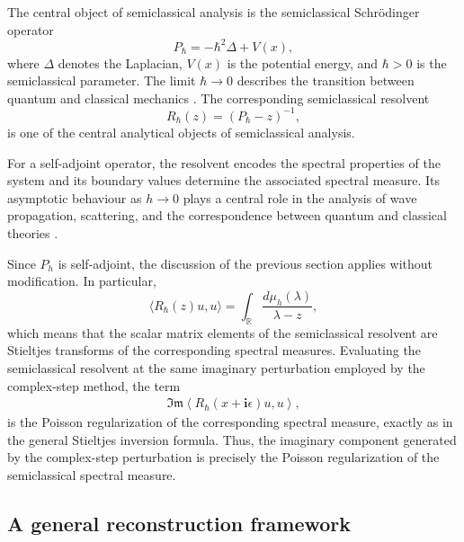 \documentclass[11pt]{article}
\newcommand{\imag}{\textbf{i}}
\newcommand{\ImagPart}{\mathfrak{Im}}
\begin{document}
    The central object of semiclassical analysis is the semiclassical Schr\"odinger operator
    \begin{equation}
    	P_{\hbar}=-\hbar^2\Delta+V(x),
    	\label{eq.semiclassical_Schroedinger}
    \end{equation}
    where \(\Delta\) denotes the Laplacian, \(V(x)\) is the potential energy, and \(\hbar>0\) is the semiclassical parameter. The limit \(\hbar\rightarrow0\) describes the transition between quantum and classical mechanics \citep{zworski2012semiclassical}. The corresponding semiclassical resolvent
    \begin{equation}
    	R_{\hbar}(z)
    	=
    	(P_{\hbar}-z)^{-1},
    	\label{eq.resolvendt}
    \end{equation}
    is one of the central analytical objects of semiclassical analysis.
    
    For a self-adjoint operator, the resolvent encodes the spectral properties of the system and its boundary values determine the associated spectral measure. Its asymptotic behaviour as \(h\rightarrow0\) plays a central role in the analysis of wave propagation, scattering, and the correspondence between quantum and classical theories
    \citep{zworski2012semiclassical,dyatlov2019mathematical,teschl2014mathematical}.
    
    Since \(P_h\) is self-adjoint, the discussion of the previous section applies without modification. In particular,
    \begin{equation}
    	\langle R_{\hbar}(z)u,u\rangle
    	=
    	\int_{\mathbb R}
    	\frac{d\mu_h(\lambda)}
    	{\lambda-z},
    \end{equation}
    which means that the scalar matrix elements of the semiclassical resolvent are Stieltjes transforms of the corresponding spectral measures. Evaluating the semiclassical resolvent at the same imaginary perturbation employed by the complex-step method, the term 
    \begin{align}
    	\ImagPart \left\langle
    	R_{\hbar}(x+\imag\epsilon)u,u
    	\right\rangle ,
    \end{align}
    is the Poisson regularization of the corresponding spectral measure, exactly as in the general Stieltjes inversion formula. Thus, the imaginary component generated by the complex-step perturbation is precisely the Poisson regularization of the semiclassical spectral measure.
   
   \subsection{A general reconstruction framework}
   
\end{document}
